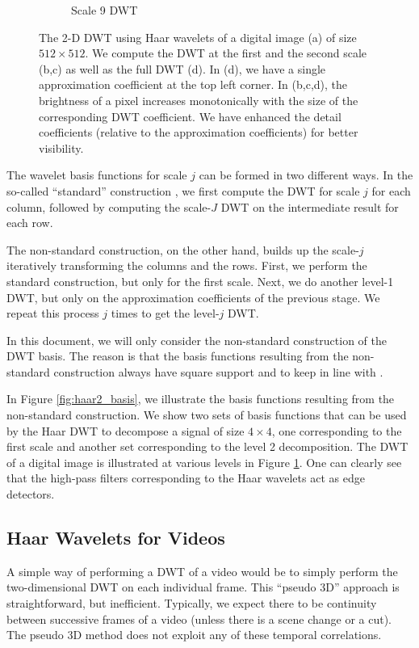 \begin{figure}
\begin{subfigure}{0.4\textwidth}
  \caption{Scale 9 DWT}
\end{subfigure}
\caption[2-D Haar DWT Example]{The 2-D DWT using Haar wavelets of a digital image (a) of size $512\times 512$.
  We compute the DWT at the first and the second scale (b,c) as well as the full DWT (d).
  In (d), we have a single approximation coefficient at the top left corner.
  In (b,c,d), the brightness of a pixel increases monotonically with the size of the corresponding DWT coefficient.
  We have enhanced the detail coefficients (relative to the approximation coefficients) for better visibility.}
\label{fig:dwt2}
\end{figure}

The wavelet basis functions for scale $j$ can be formed in two different ways.
In the so-called ``standard'' construction \cite{stollnitz1995}, we first compute the DWT for scale $j$ for each column, followed by computing the scale-$J$ DWT on the intermediate result for each row.

The non-standard construction, on the other hand, builds up the scale-$j$ iteratively transforming the columns and the rows.
First, we perform the standard construction, but only for the first scale.
Next, we do another level-1 DWT, but only on the approximation coefficients of the previous stage.
We repeat this process $j$ times to get the level-$j$ DWT.

In this document, we will only consider the non-standard construction of the DWT basis.
The reason is that the basis functions resulting from the non-standard construction always have square support and to keep in line with \cite{pilikos2014}.

In Figure \ref{fig:haar2_basis}, we illustrate the basis functions resulting from the non-standard construction. 
We show two sets of basis functions that can be used by the Haar DWT to decompose a signal of size $4\times 4$, one corresponding to the first scale and another set corresponding to the level 2 decomposition.
The DWT of a digital image is illustrated at various levels in Figure \ref{fig:dwt2}.
One can clearly see that the high-pass filters corresponding to the Haar wavelets act as edge detectors.

\subsection{Haar Wavelets for Videos}
A simple way of performing a DWT of a video would be to simply perform the two-dimensional DWT on each individual frame.
This ``pseudo 3D'' approach is straightforward, but inefficient.
Typically, we expect there to be continuity between successive frames of a video (unless there is a scene change or a cut).
The pseudo 3D method does not exploit any of these temporal correlations.

